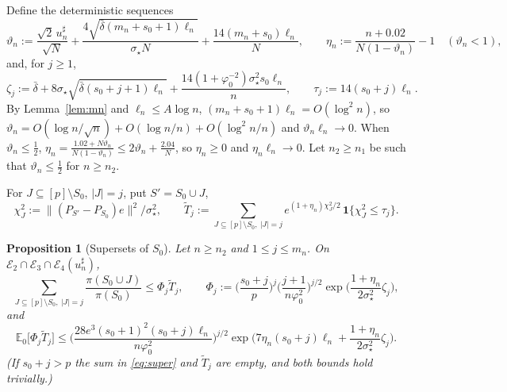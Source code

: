 \documentclass[11pt]{article}
\newtheorem{proposition}[theorem]{Proposition}
\theoremstyle{remark}
\newcommand{\E}{\mathbb E}
\newcommand{\sst}{\sigma_\star}
\begin{document}
Define the deterministic sequences
\[
\vartheta_n:=\frac{\sqrt2\,u^\sharp_n}{\sqrt N}+\frac{4\sqrt{\bar\delta(m_n+s_0+1)\ell_n}}{\sst N}+\frac{14(m_n+s_0)\ell_n}{N},\qquad \eta_n:=\frac{n+0.02}{N(1-\vartheta_n)}-1\quad(\vartheta_n<1),
\]
and, for $j\ge1$,
\[
\zeta_j:=\bar\delta+8\sst\sqrt{\bar\delta(s_0+j+1)\ell_n}+\frac{14(1+\varphi_0^{-2})\sst^2s_0\ell_n}{n},\qquad \tau_j:=14(s_0+j)\ell_n .
\]
By Lemma~\ref{lem:mn} and $\ell_n\le A\log n$, $(m_n+s_0+1)\ell_n=O(\log^2n)$, so $\vartheta_n=O(\log n/\sqrt n)+O(\log n/n)+O(\log^2n/n)$ and $\vartheta_n\ell_n\to0$. When $\vartheta_n\le\frac12$, $\eta_n=\frac{1.02+N\vartheta_n}{N(1-\vartheta_n)}\le2\vartheta_n+\frac{2.04}N$, so $\eta_n\ge0$ and $\eta_n\ell_n\to0$. Let $n_2\ge n_1$ be such that $\vartheta_n\le\frac12$ for $n\ge n_2$.

For $J\subseteq[p]\setminus S_0$, $|J|=j$, put $S'=S_0\cup J$,
\[
\chi^2_J:=\|(P_{S'}-P_{S_0})e\|^2/\sst^2,\qquad \tilde T_j:=\sum_{J\subseteq[p]\setminus S_0,\ |J|=j}e^{(1+\eta_n)\chi^2_J/2}\,\mathbf 1\{\chi^2_J\le\tau_j\}.
\]

\begin{proposition}[Supersets of $S_0$]\label{prop:super}
Let $n\ge n_2$ and $1\le j\le m_n$. On $\mathcal E_2\cap\mathcal E_3\cap\mathcal E_4(u_n^\sharp)$,
\begin{equation}\label{eq:super}
\sum_{J\subseteq[p]\setminus S_0,\ |J|=j}\frac{\pi(S_0\cup J)}{\pi(S_0)}\le\Phi_j\tilde T_j,\qquad \Phi_j:=\Big(\frac{s_0+j}p\Big)^j\Big(\frac{j+1}{n\varphi_0^2}\Big)^{j/2}\exp\Big(\frac{1+\eta_n}{2\sst^2}\zeta_j\Big),
\end{equation}
and
\begin{equation}\label{eq:superE}
\E_0\big[\Phi_j\tilde T_j\big]\le\Big(\frac{28e^3(s_0+1)^2(s_0+j)\ell_n}{n\varphi_0^2}\Big)^{j/2}\exp\Big(7\eta_n(s_0+j)\ell_n+\frac{1+\eta_n}{2\sst^2}\zeta_j\Big).
\end{equation}
(If $s_0+j>p$ the sum in \eqref{eq:super} and $\tilde T_j$ are empty, and both bounds hold trivially.)
\end{proposition}
\end{document}
